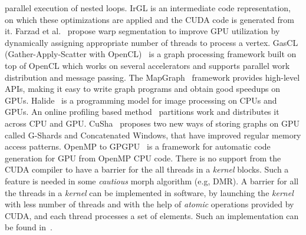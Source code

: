  parallel execution of nested  loops. IrGL is an intermediate code representation, on which these optimizations are applied and the CUDA code is generated from it. 
Farzad et al.~\cite{Farzad2016} propose warp segmentation to improve  GPU  utilization by
dynamically assigning appropriate number of threads to process a vertex.
GasCL (Gather-Apply-Scatter with OpenCL)~\cite{GasCL2013}  is a graph processing framework  built on top of
OpenCL which works  on several  accelerators and supports parallel work distribution and message passing.
The  MapGraph~\cite{Fu:2014:MHL:2621934.2621936}  framework  provides  high-level APIs, making it easy  to write graph programs and obtain good  speedups on GPUs.
 Halide~\cite{Ragan-Kelley:2013:HLC:2491956.2462176} is a programming model for image processing on CPUs and GPUs.
 An online profiling based method~\cite{Kaleem:2014:AHS:2628071.2628088} partitions work and distributes it across CPU and GPU.
CuSha~\cite{Khorasani:2014:CVG:2600212.2600227}  proposes two new ways of storing graphs on GPU called G-Shards and Concatenated Windows,  that have improved regular memory access patterns.
OpenMP to GPGPU~\cite{Lee:2009:OGC:1594835.1504194} is a framework for automatic code generation
for GPU from OpenMP CPU code. There is no support from the CUDA compiler to have a barrier for the all threads in a {\it kernel} blocks. Such a feature is needed in some {\it cautious} morph algorithm (e.g, DMR). 
A barrier for all the threads in a {\it kernel} can be  implemented in software, by launching the {\it kernel} with less number of threads and 
 with the help of {\it atomic} operations provided by CUDA, and  each thread processes a set of elements.
 Such an implementation can be found in~\cite{Feng5470477}. 
